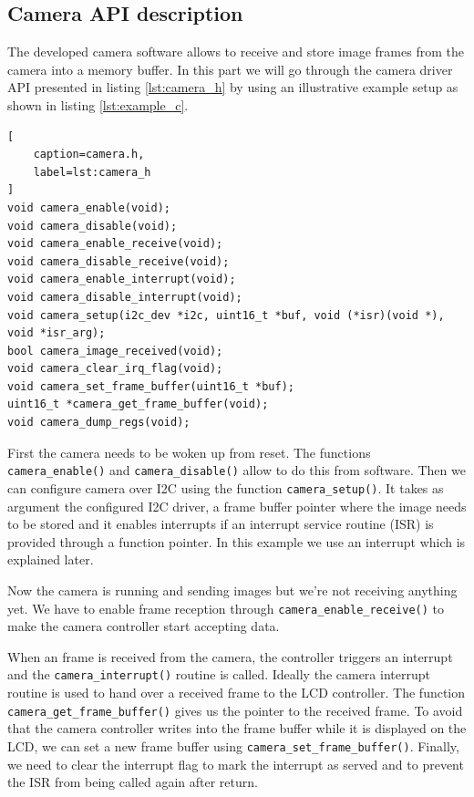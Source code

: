 \documentclass{article}
\begin{document}
\subsection{Camera API description}
The developed camera software allows to receive and store image frames from the camera into a memory buffer. In this part we will go through the camera driver API presented in listing \ref{lst:camera_h} by using an illustrative example setup as shown in listing \ref{lst:example_c}.

\begin{lstlisting}[
    caption=camera.h,
    label=lst:camera_h
]
void camera_enable(void);
void camera_disable(void);
void camera_enable_receive(void);
void camera_disable_receive(void);
void camera_enable_interrupt(void);
void camera_disable_interrupt(void);
void camera_setup(i2c_dev *i2c, uint16_t *buf, void (*isr)(void *), void *isr_arg);
bool camera_image_received(void);
void camera_clear_irq_flag(void);
void camera_set_frame_buffer(uint16_t *buf);
uint16_t *camera_get_frame_buffer(void);
void camera_dump_regs(void);
\end{lstlisting}

First the camera needs to be woken up from reset. The functions \verb'camera_enable()' and \verb'camera_disable()' allow to do this from software.
Then we can configure camera over I2C using the function \verb'camera_setup()'.
It takes as argument the configured I2C driver, a frame buffer pointer where the image needs to be stored and it enables interrupts if an interrupt service routine (ISR) is provided through a function pointer.
In this example we use an interrupt which is explained later. 

Now the camera is running and sending images but we're not receiving anything yet.
We have to enable frame reception through \verb'camera_enable_receive()' to make the camera controller start accepting data.

When an frame is received from the camera, the controller triggers an interrupt and the \verb'camera_interrupt()' routine is called. Ideally the camera interrupt routine is used to hand over a received frame to the LCD controller.
The function \verb'camera_get_frame_buffer()' gives us the pointer to the received frame.
To avoid that the camera controller writes into the frame buffer while it is displayed on the LCD, we can set a new frame buffer using \verb'camera_set_frame_buffer()'.
Finally, we need to clear the interrupt flag to mark the interrupt as served and to prevent the ISR from being called again after return.
\end{document}

